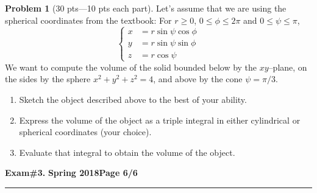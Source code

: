 \documentclass[12pt]{article}
\theoremstyle{definition}
\newtheorem{problem}{Problem}
\begin{document}
\bigskip
\begin{problem}[30 pts---10 pts each part]
Let's assume that we are using the spherical coordinates from the textbook: For $r \geq 0$, $0 \leq \phi \leq 2\pi$ and $0\leq \psi \leq \pi$,
\begin{equation*}
\begin{cases}
x &= r \sin\psi \cos\phi \\
y &= r \sin\psi \sin\phi \\
z &= r \cos\psi
\end{cases}
\end{equation*}
We want to compute the volume of the solid bounded below by the $xy$--plane, on the sides by the sphere $x^2+y^2+z^2=4$, and above by the cone $\psi=\pi/3$. 
\begin{enumerate}
\item Sketch the object described above to the best of your ability.
\vspace{4cm}
\item Express the volume of the object as a triple integral in either cylindrical or spherical coordinates (your choice).
\vspace{4cm}
\begin{flushright}
\end{flushright}
\item Evaluate that integral to obtain the volume of the object.
\vspace{4cm}
\begin{flushright}
\end{flushright}
\end{enumerate}
\end{problem}
\newpage

\hfill{\large\bf Exam\#3.}\hfill{\large\bf
  Spring 2018}\hfill{\large\bf Page 6/6}\hrule
\end{document}
